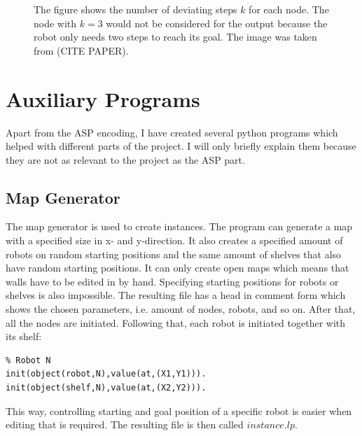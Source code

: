 \documentclass[runningheads]{llncs}
\begin{document}
\begin{figure}[h]
\caption{The figure shows the number of deviating steps $k$ for each node. The node with $k=3$ would not be considered for the output because the robot only needs two steps to reach its goal. The image was taken from (CITE PAPER).}
\label{fig:rn}
\end{figure}

\section{Auxiliary Programs}
Apart from the ASP encoding, I have created several python programs which helped with different parts of the project. I will only briefly explain them because they are not as relevant to the project as the ASP part.
\subsection{Map Generator}
The map generator is used to create instances. The program can generate a map with a specified size in x- and y-direction. It also creates a specified amount of robots on random starting positions and the same amount of shelves that also have random starting positions. It can only create open maps which means that walls have to be edited in by hand. Specifying starting positions for robots or shelves is also impossible. The resulting file has a head in comment form which shows the chosen parameters, i.e. amount of nodes, robots, and so on. After that, all the nodes are initiated. Following that, each robot is initiated together with its shelf:
\begin{verbatim}
% Robot N
init(object(robot,N),value(at,(X1,Y1))).
init(object(shelf,N),value(at,(X2,Y2))).
\end{verbatim}
This way, controlling starting and goal position of a specific robot is easier when editing that is required. The resulting file is then called $instance.lp$.
\end{document}
